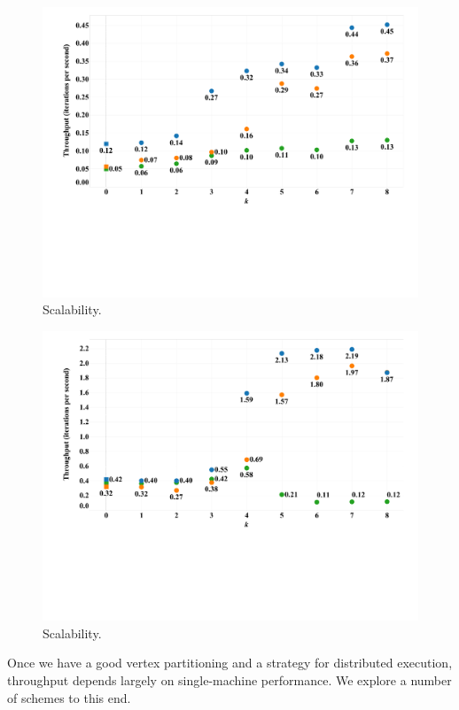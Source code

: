 \begin{figure}[h]
\centering
\includegraphics[width=5in,clip,trim=1cm 6cm 0 0]{figures/scalability_hilbert_bits_serial.pdf}
\caption{Scalability.}
\label{fig:scalability_hilbert_bits_serial}
\end{figure}

\begin{figure}[h]
\centering
\includegraphics[width=5in,clip,trim=1cm 6cm 0 0]{figures/scalability_hilbert_bits_parallel.pdf}
\caption{Scalability.}
\label{fig:scalability_hilbert_bits_parallel}
\end{figure}



Once we have a good vertex partitioning and a strategy for distributed execution, throughput depends largely on single-machine performance. We explore a number of schemes to this end.


